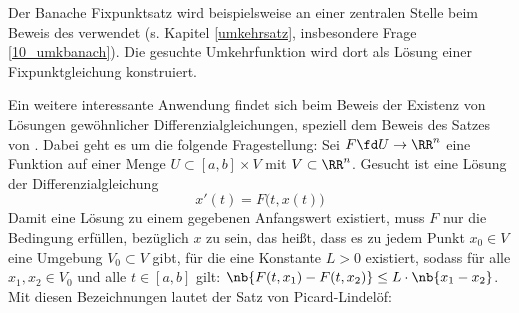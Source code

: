 \begin{antwort}
  Der Banach\sch e Fixpunktsatz wird beispielsweise 
  an einer zentralen Stelle  
  beim Beweis des  verwendet 
  (s. Kapitel \ref{umkehrsatz}, insbesondere Frage \ref{10_umkbanach}). 
  Die gesuchte Umkehrfunktion wird dort als Lösung einer 
  Fixpunktgleichung konstruiert. 

  Ein weitere interessante Anwendung findet sich beim 
  Beweis der Existenz von Lösungen gewöhnlicher Differenzialgleichungen, 
  speziell dem Beweis des Satzes von . 
  Dabei geht es um die folgende Fragestellung:  
  Sei $F \fd U\to \RR^n$ eine Funktion auf einer Menge 
  $U\subset [a,b] \times V$ mit $V\subset\RR^n$. 
  Gesucht ist eine Lösung der Differenzialgleichung 
  \[
  x'(t) = F \big( t, x(t) \big)  
  \]
  Damit eine Lösung zu einem gegebenen 
  Anfangswert existiert, muss $F$ nur die Bedingung erfüllen, 
  bezüglich $x$ zu sein, das heißt, dass es zu jedem Punkt 
  $x_0\in V$ eine Umgebung 
  $V_0\subset V$ gibt, für die eine Konstante $L>0$ existiert, 
  sodass für alle $x_1,x_2\in V_0$ und alle 
  $t\in[a,b]$ gilt: $
  \nb{ F(t,x_1)-F(t,x_2) } \le L \cdot \nb{ x_1-x_2}$.
  Mit diesen Bezeichnungen lautet der Satz von Picard-Lindelöf: 

  \medskip\noindent


\end{antwort}
